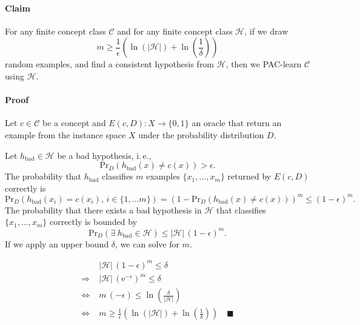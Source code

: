 \paragraph*{Claim}

For any finite concept class $\mathcal{C}$ and for any finite concept
class $\mathcal{H}$, if we draw
\[
m\geq\frac{1}{\epsilon}\left(\ln\left(\vert\mathcal{H}\vert\right)+\ln\left(\frac{1}{\delta}\right)\right)
\]
random examples, and find a consistent hypothesis from $\mathcal{H}$,
then we PAC-learn $\mathcal{C}$ using $\mathcal{H}$.


\paragraph*{Proof}

Let $c\in\mathcal{C}$ be a concept and $E(c,D):X\rightarrow\{0,1\}$
an oracle that return an example from the instance space $X$ under
the probability distribution $D$.

Let $h_{\mathrm{bad}}\in\mathcal{H}$ be a bad hypothesis, i.$\,$e.,
\[
\mathrm{Pr}_{D}(h_{\mathrm{bad}}(x)\neq c(x))>\epsilon.
\]
The probability that $h_{\mathrm{bad}}$ classifies $m$ examples
$\{x_{1},\ldots,x_{m}\}$ returned by $E(c,D)$ correctly is
\[
\mathrm{Pr}_{D}(h_{\mathrm{bad}}(x_{i})=c(x_{i}),\, i\in\{1,\ldots m\})=\left(1-\mathrm{Pr}_{D}(h_{\mathrm{bad}}(x)\neq c(x))\right)^{m}\leq(1-\epsilon)^{m}.
\]
The probability that there exists a bad hypothesis in $\mathcal{H}$
that classifies $\{x_{1},\ldots,x_{m}\}$ correctly is bounded by
\[
\mathrm{Pr}_{D}(\exists\; h_{\mathrm{bad}}\in\mathcal{H})\leq\vert\mathcal{H}\vert\,(1-\epsilon)^{m}.
\]
If we apply an upper bound $\delta$, we can solve for $m$.

\[
\begin{aligned} & \vert\mathcal{H}\vert\,(1-\epsilon)^{m}\leq\delta\\
\Rightarrow\; & \vert\mathcal{H}\vert\,(\mathrm{e}^{-\epsilon})^{m}\leq\delta\\
\Leftrightarrow\; & m\,(-\epsilon)\leq\ln\left(\frac{\delta}{\vert\mathcal{H}\vert}\right)\\
\Leftrightarrow\; & m\geq\frac{1}{\epsilon}\left(\ln(\vert\mathcal{H}\vert)+\ln\left(\frac{1}{\delta}\right)\right)\quad\blacksquare
\end{aligned}
\]